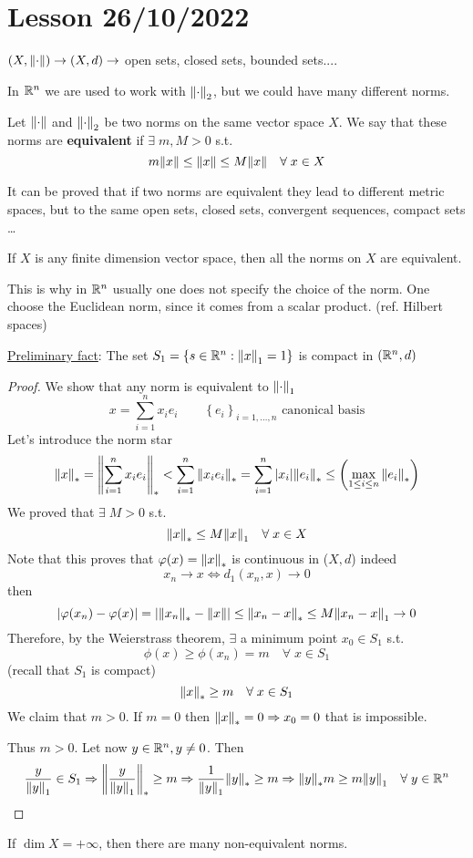 \section{Lesson 26/10/2022}
\((X, \norm{\cdot}) \to (X, d) \to \) open sets, closed sets, bounded sets....

In \(\mathbb{R}^n\) we are used to work with \(\norm{\cdot}_2\), but we could have many different norms.
\begin{definition}
    Let \(\norm{\cdot}\) and \(\norm{\cdot}_2\) be two norms on the same vector space \(X\). We say that these norms are \textbf{equivalent} if \(\exists \; m, M >0\) s.t. 
    \[
        m\norm{x} \leq \norm{x} \leq M\norm{x} \quad \forall\; x \in X
    \]
\end{definition}
It can be proved that if two norms are equivalent they lead to different metric spaces, but to the same open sets, closed sets, convergent sequences, compact sets \dots
\begin{theorem}
    If \(X\) is any finite dimension vector space, then all the norms on \(X\) are equivalent.
\end{theorem}
\begin{remark}
    This is why in \(\mathbb{R}^n\) usually one does not specify the choice of the norm. One choose the Euclidean norm, since it comes from a scalar product. (ref. Hilbert spaces)
\end{remark}
\underline{Preliminary fact}: The set \(S_1 = \left\{ s \in \mathbb{R}^n : \norm{x}_1  = 1\right\}\) is compact in \((\mathbb{R}^n, d)\)
\begin{proof}
    We show that any norm is equivalent to \(\norm{\cdot}_1\)
    \[
        x = \sum_{i=1}^n x_i e_i \qquad \left\{ e_i \right\}_{i= 1,\ldots, n} \mbox{ canonical basis}
    \]
    Let's introduce the norm star 
    \[
        \norm{x}_* = \norm{\sum_{i=1}^n x_i e_i}_* < \sum_{i=1}^n \norm{x_i e_i}_* = \sum_{i=1}^n \abs{x_i} \norm{e_i}_* \leq \left(\max_{1 \leq i \leq n} \norm{e_i}_*\right)
    \]
    We proved that \(\exists \; M> 0\) s.t.
    \[
        \norm{x}_* \leq M \norm{x}_1 \quad \forall \; x \in X
    \]
    Note that this proves that \(\varphi(x) = \norm{x}_*\) is continuous in (\(X, d\)) indeed 
    \[
        x_n \to x \Leftrightarrow d_1(x_n, x) \to 0
    \]
    then 
    \[
        \abs{\varphi(x_n) - \varphi(x)} = \abs{\norm{x_n}_* -\norm{x}} \leq \norm{x_n - x}_* \leq M\norm{x_n - x}_1 \to 0
    \]
    Therefore, by the Weierstrass theorem, \(\exists\) a minimum point \(x_0 \in S_1\) s.t. 
    \[
        \phi(x) \geq \phi(x_n) = m \quad \forall\; x \in S_1
    \]
    (recall that \(S_1\) is compact)
    \[
        \norm{x}_* \geq m \quad \forall \; x \in S_1
    \]
    We claim that \(m>0\). If \(m=0\) then \(\norm{x}_* = 0 \Rightarrow x_0  = 0\) that is impossible.

    Thus \(m>0\). Let now \(y \in \mathbb{R}^n, y \neq 0\). Then 
    \[
        \frac{y}{\norm{y}_1} \in S_1 \Rightarrow \norm{\frac{y}{\norm{y}_1}}_* \geq m \Rightarrow \frac{1}{\norm{y}_1} \norm{y}_* \geq m \Rightarrow \norm{y}_*m\geq m \norm{y}_1 \quad \forall \; y \in \mathbb{R}^n 
    \]
\end{proof}
If \(\dim X = +\infty\), then there are many non-equivalent norms.


